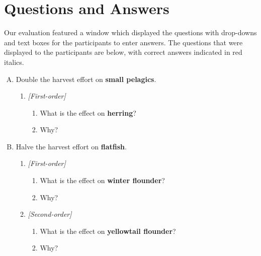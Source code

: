 \section{Questions and Answers} \label{sec:questions}

Our evaluation featured a window which displayed the questions with drop-downs and text boxes for the participants to enter answers.  The questions that were displayed to the participants are below, with correct answers indicated in red italics.

\begin{enumerate}[(A)]
\item Double the harvest effort on \textbf{small pelagics}.

\begin{enumerate}[1.]
\item \textit{[First-order]}
\begin{enumerate}
\item What is the effect on \textbf{herring}? 
\item Why? 
\end{enumerate}
\end{enumerate}

\item Halve the harvest effort on \textbf{flatfish}.

\begin{enumerate}[1.] \addtocounter{enumii}{1}
\item \textit{[First-order]}
\begin{enumerate}
\item What is the effect on \textbf{winter flounder}? 
\item Why? 
\end{enumerate}

\item  \textit{[Second-order]}
\begin{enumerate}
\item What is the effect on \textbf{yellowtail flounder}? 
\item Why? 
\end{enumerate}
\end{enumerate}


\end{enumerate}
